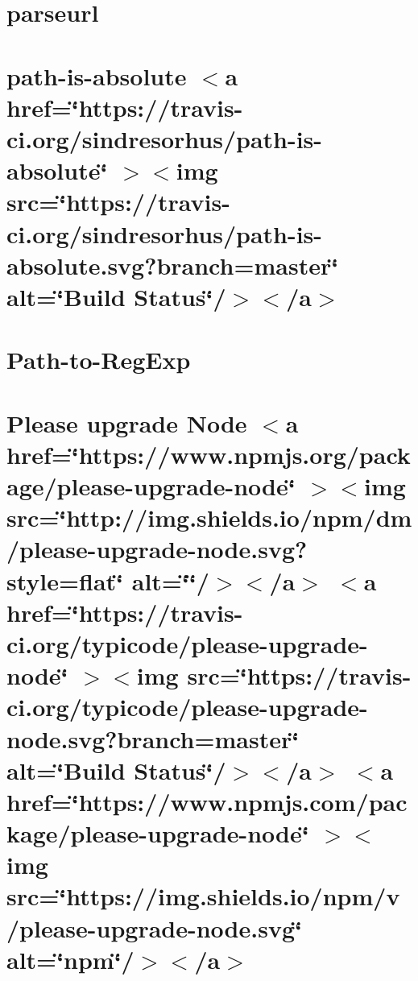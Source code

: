 \documentclass[twoside]{book}
\newcommand{\+}{\discretionary{\mbox{\scriptsize$\hookleftarrow$}}{}{}}
\begin{document}
\chapter{parseurl}
\label{md_src_nodejs_node_modules_parseurl_README}

\chapter{path-\/is-\/absolute \texorpdfstring{$<$}{<}a href=\char`\"{}https\+://travis-\/ci.\+org/sindresorhus/path-\/is-\/absolute\char`\"{} \texorpdfstring{$>$}{>}\texorpdfstring{$<$}{<}img src=\char`\"{}https\+://travis-\/ci.\+org/sindresorhus/path-\/is-\/absolute.\+svg?branch=master\char`\"{} alt=\char`\"{}\+Build Status\char`\"{}/\texorpdfstring{$>$}{>}\texorpdfstring{$<$}{<}/a\texorpdfstring{$>$}{>}}
\label{md_src_nodejs_node_modules_path_is_absolute_readme}

\chapter{Path-\/to-\/\+Reg\+Exp}
\label{md_src_nodejs_node_modules_path_to_regexp_Readme}

\chapter{Please upgrade Node \texorpdfstring{$<$}{<}a href=\char`\"{}https\+://www.\+npmjs.\+org/package/please-\/upgrade-\/node\char`\"{} \texorpdfstring{$>$}{>}\texorpdfstring{$<$}{<}img src=\char`\"{}http\+://img.\+shields.\+io/npm/dm/please-\/upgrade-\/node.\+svg?style=flat\char`\"{} alt=\char`\"{}\char`\"{}/\texorpdfstring{$>$}{>}\texorpdfstring{$<$}{<}/a\texorpdfstring{$>$}{>} \texorpdfstring{$<$}{<}a href=\char`\"{}https\+://travis-\/ci.\+org/typicode/please-\/upgrade-\/node\char`\"{} \texorpdfstring{$>$}{>}\texorpdfstring{$<$}{<}img src=\char`\"{}https\+://travis-\/ci.\+org/typicode/please-\/upgrade-\/node.\+svg?branch=master\char`\"{} alt=\char`\"{}\+Build Status\char`\"{}/\texorpdfstring{$>$}{>}\texorpdfstring{$<$}{<}/a\texorpdfstring{$>$}{>} \texorpdfstring{$<$}{<}a href=\char`\"{}https\+://www.\+npmjs.\+com/package/please-\/upgrade-\/node\char`\"{} \texorpdfstring{$>$}{>}\texorpdfstring{$<$}{<}img src=\char`\"{}https\+://img.\+shields.\+io/npm/v/please-\/upgrade-\/node.\+svg\char`\"{} alt=\char`\"{}npm\char`\"{}/\texorpdfstring{$>$}{>}\texorpdfstring{$<$}{<}/a\texorpdfstring{$>$}{>}}
\label{md_src_nodejs_node_modules_please_upgrade_node_README}

\end{document}
